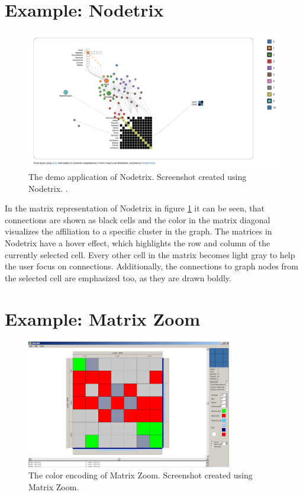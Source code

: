 \section{Example: Nodetrix}


\begin{figure}[H]
\includegraphics[width=\textwidth]{images/nodetrix_cell}
\caption{The demo application of Nodetrix. Screenshot created using Nodetrix. \citep[1302-1309]{henry-nodetrix-2007}.\label{fig:cell_nodetrix}}
\end{figure}



In the matrix representation of Nodetrix in figure \ref{fig:cell_nodetrix} it can be seen, that connections are shown as black cells and the color in the matrix diagonal visualizes the affiliation to a specific cluster in the graph. The matrices in Nodetrix have a hover effect, which highlights the row and column of the currently selected cell. Every other cell in the matrix becomes light gray to help the user focus on connections. Additionally, the connections to graph nodes from the selected cell are emphasized too, as they are drawn boldly. \citep[1302-1309]{henry-nodetrix-2007}

\section{Example: Matrix Zoom}

\begin{figure}[H]
\centering
\includegraphics[width=0.8\textwidth]{images/matrixzoom_cell}
\caption{The color encoding of Matrix Zoom. Screenshot created using Matrix Zoom. \citep[227--232]{ham-ivis-2003}\label{fig:zell_matrixzoom}}
\end{figure}


